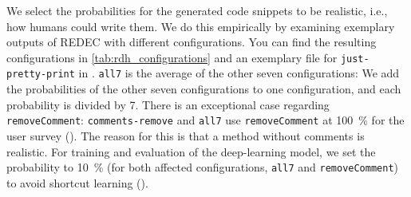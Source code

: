\documentclass[%
class=scrreprt,
chapterprefix=false,%
open=right,%
twoside=true,%
paper=a4,%
logofile={Logo\_zentral\_farbig\_EN.png},%
thesistype=master,%
UKenglish,%
]{se2thesis}
\theoremstyle{definition}
\newcommand{\none}{just-pretty-print\xspace} %
\newcommand{\nonet}{\texttt{\none}\xspace} %
\begin{document}
	We select the probabilities for the generated code snippets to be realistic, i.e., how humans could write them. We do this empirically by examining exemplary outputs of REDEC with different configurations. You can find the resulting configurations in \autoref{tab:rdh_configurations} and an exemplary file for \nonet in .
    \texttt{all7} is the average of the other seven configurations: We add the probabilities of the other seven configurations to one configuration, and each probability is divided by 7.
    There is an exceptional case regarding \texttt{removeComment}: \texttt{comments-remove} and \texttt{all7} use \texttt{removeComment} at 100~\% for the user survey (). The reason for this is that a method without comments is realistic. For training and evaluation of the deep-learning model, we set the probability to 10~\% (for both affected configurations, \texttt{all7} and \texttt{removeComment}) to avoid shortcut learning ().
	
\end{document}
